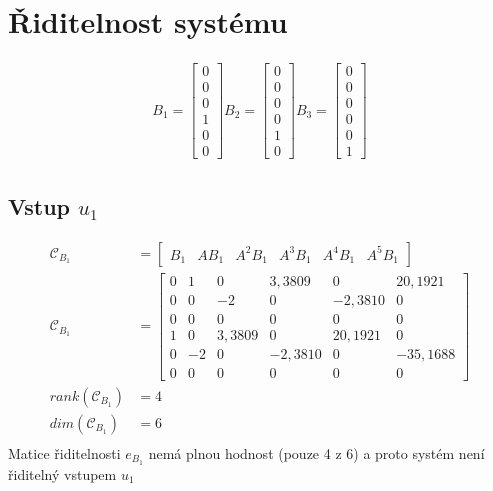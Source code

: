 \documentclass{article}
\newcommand\mat[1]{\begin{bmatrix}#1\end{bmatrix}}
\begin{document}
\section{Řiditelnost systému}
\begin{align*}
    B_1 = \mat{0\\
               0\\
               0\\
               1\\
               0\\
               0}
     B_2 = \mat{0\\
               0\\
               0\\
               0\\
               1\\
               0}
     B_3 = \mat{0\\
               0\\
               0\\
               0\\
               0\\
               1}
\end{align*}

\subsection{Vstup $u_1$}
\begin{align*}
    \mathcal{C}_{B_1} &= \mat{B_1 & AB_1 & A^2B_1 & A^3B_1 & A^4B_1 & A^5B_1}\\
    \mathcal{C}_{B_1} &= \mat{0 & 1 & 0 & 3,3809 & 0 & 20,1921\\
                   0 & 0 & -2 & 0 & -2,3810 & 0\\
                   0 & 0 & 0 & 0 & 0 & 0\\
                   1 & 0 & 3,3809 & 0 & 20,1921 & 0\\
                   0 & -2 & 0 & -2,3810 & 0 & -35,1688\\
                   0 & 0 & 0 & 0 & 0 & 0}\\
    rank(\mathcal{C}_{B_1}) &= 4\\
    dim(\mathcal{C}_{B_1}) &= 6\\
\end{align*}
Matice řiditelnosti $e_{B_1}$ nemá plnou hodnost (pouze 4 z 6) a proto systém není řiditelný vstupem $u_1$
\end{document}
